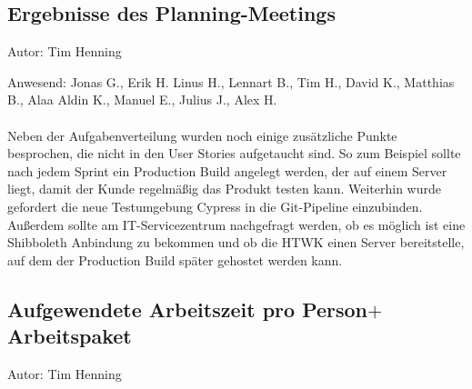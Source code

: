 \subsection{Ergebnisse des Planning-Meetings}
{\small Autor: Tim Henning}

Anwesend: Jonas G., Erik H. Linus H., Lennart B., Tim H., David K., Matthias B., Alaa Aldin K., Manuel E., Julius J., Alex H.\\
\\

Neben der Aufgabenverteilung wurden noch einige zusätzliche Punkte besprochen, die nicht in den User Stories aufgetaucht sind. So zum Beispiel sollte nach jedem Sprint ein Production Build angelegt werden, der auf einem Server liegt, damit der Kunde regelmäßig das Produkt testen kann. Weiterhin wurde gefordert die neue Testumgebung Cypress in die Git-Pipeline einzubinden. Außerdem sollte am IT-Servicezentrum nachgefragt werden, ob es möglich ist eine Shibboleth Anbindung zu bekommen und ob die HTWK einen Server bereitstelle, auf dem der Production Build später gehostet werden kann.

\subsection{Aufgewendete Arbeitszeit pro Person$+$Arbeitspaket}
{\small Autor: Tim Henning}

